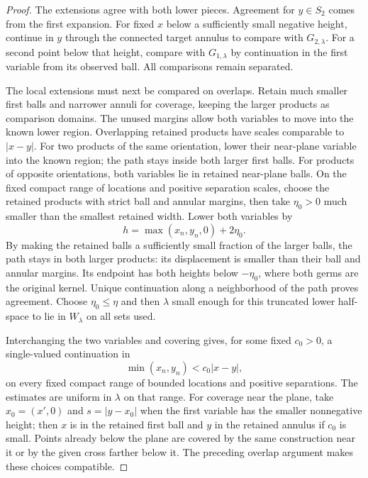 \documentclass[11pt]{article}
\theoremstyle{definition}
\theoremstyle{remark}
\numberwithin{equation}{section}
\begin{document}
\begin{proof}
The extensions agree with both lower pieces.  Agreement for $y\in S_2$
comes from the first expansion.  For fixed $x$ below a sufficiently
small negative height, continue in $y$ through the connected target
annulus to compare with $G_{2,\lambda}$.  For a second point below that
height, compare with $G_{1,\lambda}$ by continuation in the first
variable from its observed ball.  All comparisons remain separated.

The local extensions must next be compared on overlaps. Retain much
smaller first balls and narrower annuli for coverage, keeping the larger
products as comparison domains. The unused margins allow both variables
to move into the known lower region. Overlapping retained products have
scales comparable to $|x-y|$. For two products of the same orientation,
lower their near-plane variable into the known region; the path stays
inside both larger first balls.  For products of opposite orientations,
both variables lie in retained near-plane balls. On the fixed compact
range of locations and positive separation scales, choose the retained
products with strict ball and annular margins, then take $\eta_0>0$
much smaller than the smallest retained width. Lower both variables by
\[
 h=\max(x_n,y_n,0)+2\eta_0.
\]
By making the retained balls a sufficiently small fraction of the larger
balls, the path stays in both larger products: its displacement is
smaller than their ball and annular margins. Its endpoint has both
heights below $-\eta_0$,
where both germs are the original kernel.  Unique continuation along
a neighborhood of the path proves agreement.  Choose
$\eta_0\le\eta$ and then $\lambda$ small enough for this truncated
lower half-space to lie in $W_\lambda$ on all sets used.

Interchanging the two variables and covering gives, for some fixed
$c_0>0$, a single-valued continuation in
\begin{equation}\label{cross:coarse-region}
 \min(x_n,y_n)<c_0|x-y|,
\end{equation}
on every fixed compact range of bounded locations and positive
separations.  The estimates are uniform in $\lambda$ on that range.
For coverage near the plane, take $x_0=(x',0)$ and
$s=|y-x_0|$ when the first variable has the smaller nonnegative height;
then $x$ is in the retained first ball and $y$ in the retained annulus
if $c_0$ is small.  Points already below the plane are covered by the
same construction near it or by the given cross farther below it.
The preceding overlap argument makes these choices compatible.


\end{proof}
\end{document}
